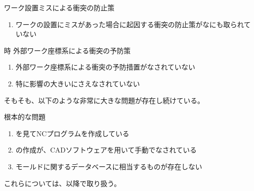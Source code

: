\begin{Issues}{ワーク設置ミスによる衝突の防止策}
\begin{enumerate}[label=\sarrow]
\item[{\sarrow[red]}]ワークの設置にミスがあった場合に起因する衝突の防止策がなにも取られていない
\end{enumerate}
\end{Issues}

\begin{Issues}{\KeywayMilling 時 外部ワーク座標系による衝突の予防策}
\begin{enumerate}[label=\sarrow]
\item[{\sarrow[red]}]外部ワーク座標系による衝突の予防措置がなされていない
\item[{\sarrow[red]}]特に影響の大きい\KeywayMilling にさえなされていない
\end{enumerate}
\end{Issues}



\clearpage
そもそも、以下のような非常に大きな問題が存在し続けている。

\begin{Issues}{根本的な問題}
\begin{enumerate}[label=\sarrow]
\item[{\sarrow[red]}] \nameDrawing を見てNCプログラムを作成している
\item[{\sarrow[red]}] \nameDrawing の作成が、CADソフトウェアを用いて手動でなされている
\item[{\sarrow[red]}] モールドに関するデータベースに相当するものが存在しない
\end{enumerate}
\end{Issues}
これらについては、以降で取り扱う。

